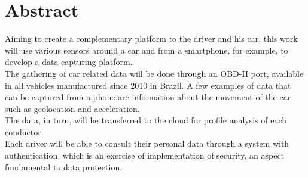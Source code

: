 \chapter*{Abstract}


\noindent Aiming to create a complementary platform to the driver and his car, this work will use various sensors around a car and from a smartphone, for example, to develop a data capturing platform. \\
The gathering of car related data will be done through an OBD-II port, available in all vehicles manufactured since 2010 in Brazil. A few examples of data that can be captured from a phone are information about the movement of the car such as geolocation and acceleration.\\
The data, in turn, will be transferred to the cloud for profile analysis of each conductor. \\
Each driver will be able to consult their personal data through a system with authentication, which is an exercise of implementation of security, an aspect fundamental to data protection.
